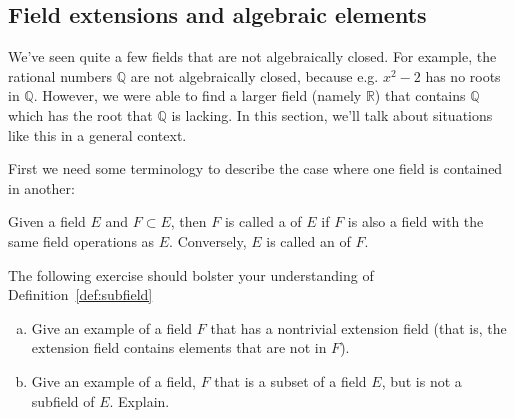 \subsection{Field extensions and algebraic elements}
We've seen quite a few fields that are not algebraically closed. For example, the rational numbers $\mathbb{Q}$ are not algebraically closed, because e.g. $x^2 - 2$ has no  roots in $\mathbb{Q}$.  However, we were able to find a larger field (namely $\mathbb{R}$) that contains $\mathbb{Q}$ which has the root that $\mathbb{Q}$ is lacking. In this section, we'll talk about situations like this in a general context. 


First we need some  terminology to describe the case where one field is contained in  another:


\begin{defn}\label{def:subfield}  
Given a field $E$ and $F\subset E$, then $F$ is called a  of $E$ if $F$ is also a field with the same field operations as $E$. Conversely, $E$ is called an  of $F$.
 \end{defn}

The following exercise should  bolster your understanding of Definition~\ref{def:subfield}

\begin{exercise}
\begin{enumerate}[(a)]
\item
Give an example of a field $F$ that has a nontrivial extension field (that is, the extension field contains elements that are not in $F$).
\item
Give an example of a field, $F$ that is a subset of a field $E$, but is not a subfield of $E$. Explain.
\end{enumerate}
\end{exercise}


